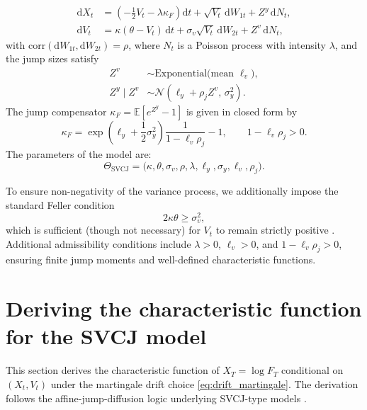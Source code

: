 \documentclass[a4paper,titlepage,12pt]{report}
\theoremstyle{plain}
\begin{document}
\begin{tcolorbox}[title={SVCJ dynamics under the futures price numeraire}]
\begin{align}
\mathrm{d}X_t
&=
\left(
-\frac{1}{2}V_t
-
\lambda \kappa_F
\right)\mathrm{d}t
+
\sqrt{V_t}\,\mathrm{d}W_{1t}
+
Z^y\,\mathrm{d}N_t,
\label{eq:svcj_X_final}
\\[4pt]
\mathrm{d}V_t
&=
\kappa(\theta - V_t)\,\mathrm{d}t
+
\sigma_v \sqrt{V_t}\,\mathrm{d}W_{2t}
+
Z^v\,\mathrm{d}N_t,
\label{eq:svcj_V_final}
\end{align}
with $\mathrm{corr}(\mathrm{d}W_{1t},\mathrm{d}W_{2t})=\rho$, where
$N_t$ is a Poisson process with intensity $\lambda$, and the jump sizes satisfy
\begin{align}
Z^{v} &\sim \text{Exponential(mean } \ell_v \text{)}, \\
Z^{y}\mid Z^{v}
&\sim
\mathcal{N}\!\left(\ell_y + \rho_j Z^{v},\, \sigma_y^2\right).
\end{align}
The jump compensator $\kappa_F=\mathbb{E}[e^{Z^y}-1]$ is given in closed form by
\begin{equation}
\kappa_F
=
\exp\!\left(\ell_y + \frac12\sigma_y^2\right)
\frac{1}{1-\ell_v\rho_j}
-
1,
\qquad
1-\ell_v\rho_j>0.
\end{equation}
The parameters of the model are:
\begin{equation}
\Theta_{\mathrm{SVCJ}}
=
\big(
\kappa,\theta,\sigma_v,\rho,\lambda,
\ell_y,\sigma_y,\ell_v,\rho_j
\big).
\end{equation}
\end{tcolorbox}

To ensure non-negativity of the variance process, we additionally impose the standard Feller
condition
\begin{equation}
2\kappa\theta \ge \sigma_v^2,
\end{equation}
which is sufficient (though not necessary) for $V_t$ to remain strictly positive \citep{Heston1993}.
Additional admissibility conditions include $\lambda>0$, $\ell_v>0$, and
$1-\ell_v\rho_j>0$, ensuring finite jump moments and well-defined characteristic
functions.


\section{Deriving the characteristic function for the SVCJ model}
\label{sec:cf_derivation}

This section derives the characteristic function of $X_T=\log F_T$ conditional on $(X_t,V_t)$ under the martingale drift choice \eqref{eq:drift_martingale}. The derivation follows the affine-jump-diffusion logic underlying SVCJ-type models \citep{DuffiePanSingleton2000, HouEtAl2020}.
\end{document}
